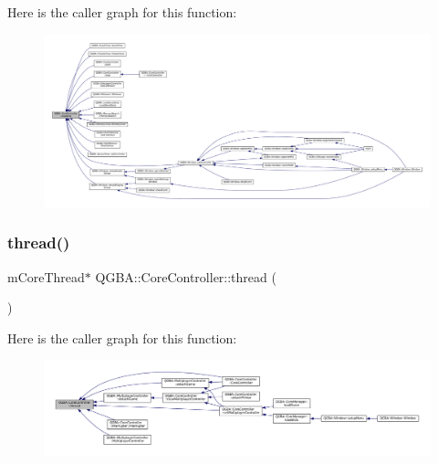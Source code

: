 Here is the caller graph for this function\+:
\nopagebreak
\begin{figure}[H]
\begin{center}
\leavevmode
\includegraphics[width=350pt]{class_q_g_b_a_1_1_core_controller_a5ee41c1bdc09690c5a5a650417cddcfa_icgraph}
\end{center}
\end{figure}
\mbox{\label{class_q_g_b_a_1_1_core_controller_a151b422f712a0f690484334d2c936605}} 
\subsubsection{\texorpdfstring{thread()}{thread()}}
{\footnotesize\ttfamily m\+Core\+Thread$\ast$ Q\+G\+B\+A\+::\+Core\+Controller\+::thread (\begin{DoxyParamCaption}{ }\end{DoxyParamCaption})\hspace{0.3cm}{\ttfamily [inline]}}

Here is the caller graph for this function\+:
\nopagebreak
\begin{figure}[H]
\begin{center}
\leavevmode
\includegraphics[width=350pt]{class_q_g_b_a_1_1_core_controller_a151b422f712a0f690484334d2c936605_icgraph}
\end{center}
\end{figure}
\mbox{\label{class_q_g_b_a_1_1_core_controller_a9bc1050a6f4a56afd974a7ed25a97298}} 
